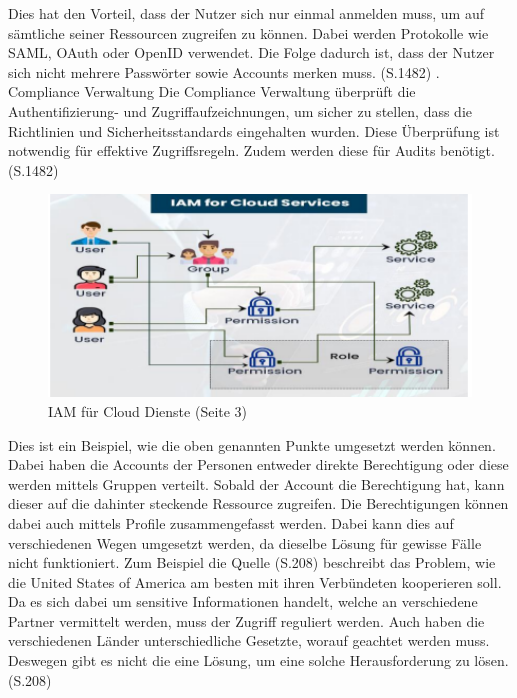 Dies hat den Vorteil, dass der Nutzer sich nur einmal anmelden muss, um auf sämtliche seiner Ressourcen zugreifen zu können.
Dabei werden Protokolle wie SAML, OAuth oder OpenID verwendet.
Die Folge dadurch ist, dass der Nutzer sich nicht mehrere Passwörter sowie Accounts merken muss. \cite{IamIEEE} (S.1482)
\newline
{}. Compliance Verwaltung
\newline
Die Compliance Verwaltung überprüft die Authentifizierung- und Zugriffaufzeichnungen, um sicher zu stellen, dass die Richtlinien und Sicherheitsstandards eingehalten wurden.
Diese Überprüfung ist notwendig für effektive Zugriffsregeln.
Zudem werden diese für Audits benötigt. \cite{IamIEEE} (S.1482)
\newline
\newline
\begin{figure}[h!]
 \centering
 \includegraphics[width=1\textwidth]{gfx/Picture/IAMISH.PNG}
 \caption{IAM für Cloud Dienste \cite{Moha19} (Seite 3)}
 \label{fig:IMAISH}
\end{figure}
Dies ist ein Beispiel, wie die oben genannten Punkte umgesetzt werden können.
Dabei haben die Accounts der Personen entweder direkte Berechtigung oder diese werden mittels Gruppen verteilt.
Sobald der Account die Berechtigung hat, kann dieser auf die dahinter steckende Ressource zugreifen.
Die Berechtigungen können dabei auch mittels Profile zusammengefasst werden.
\newline
Dabei kann dies auf verschiedenen Wegen umgesetzt werden, da dieselbe Lösung für gewisse Fälle nicht funktioniert.
Zum Beispiel die Quelle \cite{Cal17}(S.208) beschreibt das Problem, wie die United States of America am besten mit ihren Verbündeten kooperieren soll.
Da es sich dabei um sensitive Informationen handelt, welche an verschiedene Partner vermittelt werden, muss der Zugriff reguliert werden.
Auch haben die verschiedenen Länder unterschiedliche Gesetzte, worauf geachtet werden muss. 
Deswegen gibt es nicht die eine Lösung, um eine solche Herausforderung zu lösen. \cite{Cal17} (S.208)


